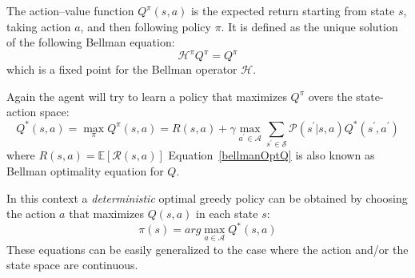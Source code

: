 	\begin{definition}[Q-Function]
		The action–value function $Q^{\pi}(s, a)$ is the expected return starting from state $s$, taking action $a$, and then following policy $\pi$.
		It is defined as the unique solution of the following Bellman equation:
		\begin{equation}
			\mathcal{H}^{\pi}Q^{\pi} = Q^{\pi}
		\end{equation}
		which is a fixed point for the Bellman operator $\mathcal{H}$.
	\end{definition}

	\noindent Again the agent will try to learn a policy that maximizes $Q^{\pi}$  overs the state-action space:
	\begin{equation}
		Q^{*}(s,a) = \max_{\pi} Q^{\pi}(s,a) = R(s,a) + \gamma \max_{a^{'} \in \mathcal{A}} \sum_{s^{'} \in \mathcal{S}} \mathcal{P}(s^{'}|s,a)Q^{*}(s^{'},a^{'})
		\label{bellmanOptQ}
	\end{equation}
	where $R(s,a) = \mathbb{E}[\mathcal{R}(s,a)]$\newline
	Equation~\ref{bellmanOptQ} is also known as Bellman optimality equation for $Q$.\newline


	\noindent In this context a \textit{deterministic} optimal greedy policy can be obtained by choosing the action $a$ that maximizes $Q(s,a)$ in each state $s$:
	\begin{equation}
		\pi(s) = arg\max_{a \in \mathcal{A}} Q^{*}(s,a)
	\end{equation}
	\newline
	\noindent These equations can be easily generalized to the case where the action and/or the state space are continuous.

